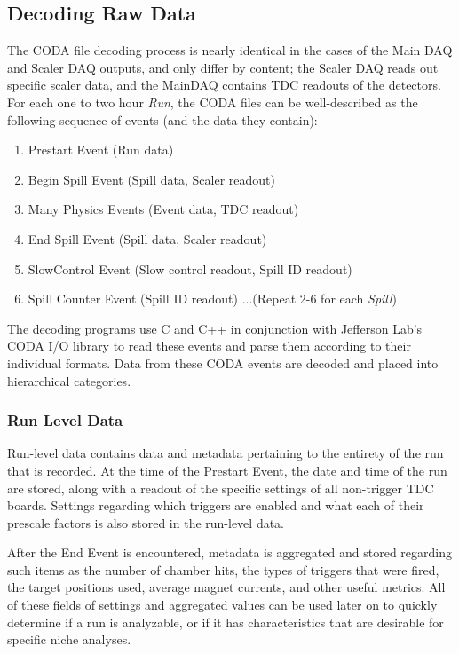 \subsection{Decoding Raw Data}

The CODA file decoding process is nearly identical in the cases of the Main DAQ and Scaler DAQ outputs, and only differ by content; the Scaler DAQ reads out specific scaler data, and the MainDAQ contains TDC readouts of the detectors. For each one to two hour \emph{Run}, the CODA files can be well-described as the following sequence of events (and the data they contain):
\begin{enumerate}
	\item Prestart Event (Run data)
	\item Begin Spill Event (Spill data, Scaler readout)
	\item Many Physics Events (Event data, TDC readout)
	\item End Spill Event (Spill data, Scaler readout)
	\item SlowControl Event (Slow control readout, Spill ID readout)
	\item Spill Counter Event (Spill ID readout) \newline ...(Repeat 2-6 for each \emph{Spill})
\end{enumerate}

The decoding programs use C and C++ in conjunction with Jefferson Lab's CODA I/O library\cite{jlab:coda} to read these events and parse them according to their individual formats. Data from these CODA events are decoded and placed into hierarchical categories.

\subsubsection{Run Level Data}

Run-level data contains data and metadata pertaining to the entirety of the run that is recorded. At the time of the Prestart Event, the date and time of the run are stored, along with a readout of the specific settings of all non-trigger TDC boards. Settings regarding which triggers are enabled and what each of their prescale factors is also stored in the run-level data.

After the End Event is encountered, metadata is aggregated and stored regarding such items as the number of chamber hits, the types of triggers that were fired, the target positions used, average magnet currents, and other useful metrics. All of these fields of settings and aggregated values can be used later on to quickly determine if a run is analyzable, or if it has characteristics that are desirable for specific niche analyses.

